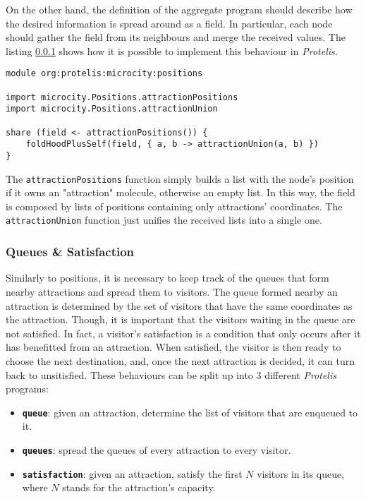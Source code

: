 On the other hand, the definition of the aggregate program should describe how the desired information is spread around as a field.
In particular, each node should gather the field from its neighbours and merge the received values. The listing \ref{} shows how it is possible to implement this behaviour in \textit{Protelis}.

\begin{lstlisting}[label=code:protelis-positions, caption=Sharing the coordinates of each attraction to all the nodes that implement this behaviour.]
module org:protelis:microcity:positions

import microcity.Positions.attractionPositions
import microcity.Positions.attractionUnion

share (field <- attractionPositions()) {
    foldHoodPlusSelf(field, { a, b -> attractionUnion(a, b) })
}
\end{lstlisting}

The \texttt{attractionPositions} function simply builds a list with the node's position if it owns an "attraction" molecule, otherwise an empty list.
In this way, the field is composed by lists of positions containing only attractions' coordinates. The \texttt{attractionUnion} function just unifies the received lists into a single one.

\subsubsection{Queues \& Satisfaction}
Similarly to positions, it is necessary to keep track of the queues that form nearby attractions and spread them to visitors.
The queue formed nearby an attraction is determined by the set of visitors that have the same coordinates as the attraction.
Though, it is important that the visitors waiting in the queue are not satisfied.
In fact, a visitor's satisfaction is a condition that only occurs after it has benefitted from an attraction.
When satisfied, the visitor is then ready to choose the next destination, and, once the next attraction is decided, it can turn back to unsitisfied.
These behaviours can be split up into 3 different \textit{Protelis} programs:
\begin{itemize}
  \item \textbf{\texttt{queue}}: given an attraction, determine the list of visitors that are enqueued to it.
  \item \textbf{\texttt{queues}}: spread the queues of every attraction to every visitor.
  \item \textbf{\texttt{satisfaction}}: given an attraction, satisfy the first $N$ visitors in its queue, where $N$ stands for the attraction's capacity.
\end{itemize}

